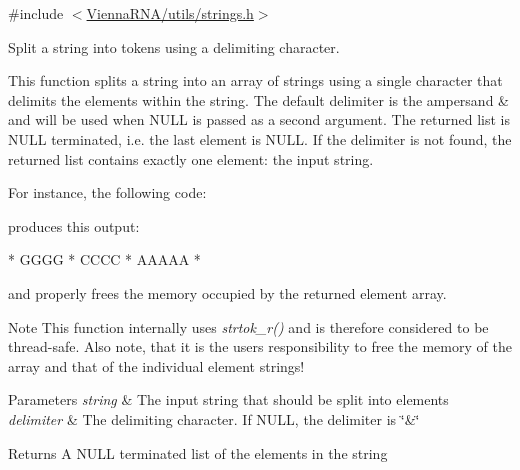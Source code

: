 {\ttfamily \#include $<$\mbox{\hyperlink{strings_8h}{Vienna\+R\+N\+A/utils/strings.\+h}}$>$}



Split a string into tokens using a delimiting character. 

This function splits a string into an array of strings using a single character that delimits the elements within the string. The default delimiter is the ampersand {\ttfamily \textquotesingle{}\&\textquotesingle{}} and will be used when {\ttfamily N\+U\+LL} is passed as a second argument. The returned list is N\+U\+LL terminated, i.\+e. the last element is {\ttfamily N\+U\+LL}. If the delimiter is not found, the returned list contains exactly one element\+: the input string.

For instance, the following code\+:


\begin{DoxyCode}{0}
\DoxyCodeLine{}
\DoxyCodeLine{\}}
\end{DoxyCode}
 produces this output\+:

\begin{DoxyVerb}* GGGG
* CCCC
* AAAAA
* \end{DoxyVerb}
 and properly free\textquotesingle{}s the memory occupied by the returned element array.

\begin{DoxyNote}{Note}
This function internally uses {\itshape strtok\+\_\+r()} and is therefore considered to be thread-\/safe. Also note, that it is the users responsibility to free the memory of the array and that of the individual element strings!
\end{DoxyNote}

\begin{DoxyParams}{Parameters}
{\em string} & The input string that should be split into elements \\
\hline
{\em delimiter} & The delimiting character. If {\ttfamily N\+U\+LL}, the delimiter is {\ttfamily \char`\"{}\&\char`\"{}} \\
\hline
\end{DoxyParams}
\begin{DoxyReturn}{Returns}
A {\ttfamily N\+U\+LL} terminated list of the elements in the string 
\end{DoxyReturn}
\mbox{\label{group__string__utils_ga4eeb3750dcf860b9f3158249f95dbd7f}} 
